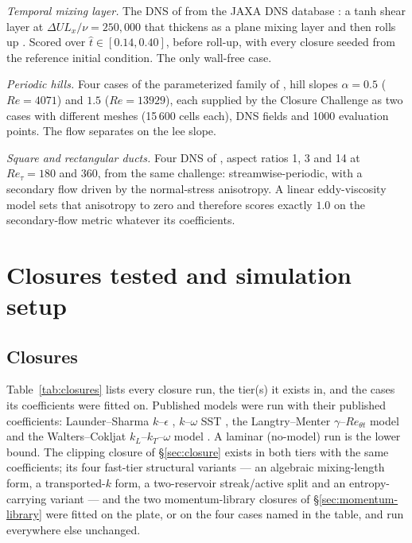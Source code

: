 \documentclass[lineno]{jfm}
\begin{document}
\emph{Temporal mixing layer.} The DNS of \citet{Lusher2026} from the JAXA
DNS database \citep{JAXADNSDatabase}: a tanh shear layer at
$\Delta U L_x/\nu = 250{,}000$ that thickens as a plane mixing layer and
then rolls up \citep{Sansica2026}. Scored over $\hat t \in [0.14, 0.40]$,
before roll-up, with every closure seeded from the reference initial
condition. The only wall-free case.

\emph{Periodic hills.} Four cases of the parameterized family of
\citet{Xiao2020}, hill slopes $\alpha = 0.5$ ($Re = 4071$) and $1.5$
($Re = 13929$), each supplied by the Closure Challenge \citep{McConkey2026}
as two cases with different meshes (15\,600 cells each), DNS fields and
1000 evaluation points. The flow separates on the lee slope.

\emph{Square and rectangular ducts.} Four DNS of \citet{Vinuesa2014}, aspect
ratios 1, 3 and 14 at $Re_\tau = 180$ and $360$, from the same challenge:
streamwise-periodic, with a secondary flow driven by the normal-stress
anisotropy. A linear eddy-viscosity model sets that anisotropy to zero and
therefore scores exactly $1.0$ on the secondary-flow metric whatever its
coefficients.

\section{Closures tested and simulation setup}\label{sec:models}\label{sec:method}

\subsection{Closures}

Table~\ref{tab:closures} lists every closure run, the tier(s) it exists in,
and the cases its coefficients were fitted on. Published models were run
with their published coefficients: Launder--Sharma $k$--$\epsilon$
\citep{LaunderSharma1974}, $k$--$\omega$ SST \citep{Menter2006}, the
Langtry--Menter $\gamma$--$Re_{\theta t}$ model \citep{LangtryMenter2009}
and the Walters--Cokljat $k_L$--$k_T$--$\omega$ model \citep{Walters2008}. A
laminar (no-model) run is the lower bound. The clipping closure of
\S\ref{sec:closure} exists in both tiers with the same
\result[NFittedCoeffs]{} coefficients; its four fast-tier structural variants
--- an algebraic mixing-length form, a transported-$k$ form, a two-reservoir
streak/active split and an entropy-carrying variant --- and the two
momentum-library closures of \S\ref{sec:momentum-library} were fitted on the
plate, or on the four cases named in the table, and run everywhere else
unchanged.
\end{document}
